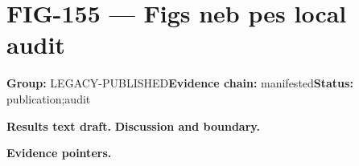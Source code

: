 \clearpage
\section{FIG-155 --- Figs neb pes local audit}
\label{figpage:fig-155}
\textbf{Group:} LEGACY-PUBLISHED\quad \textbf{Evidence chain:} manifested\quad \textbf{Status:} publication;audit

\textbf{Results text draft.} 
\textbf{Discussion and boundary.} 


\textbf{Evidence pointers.}



\vfill

